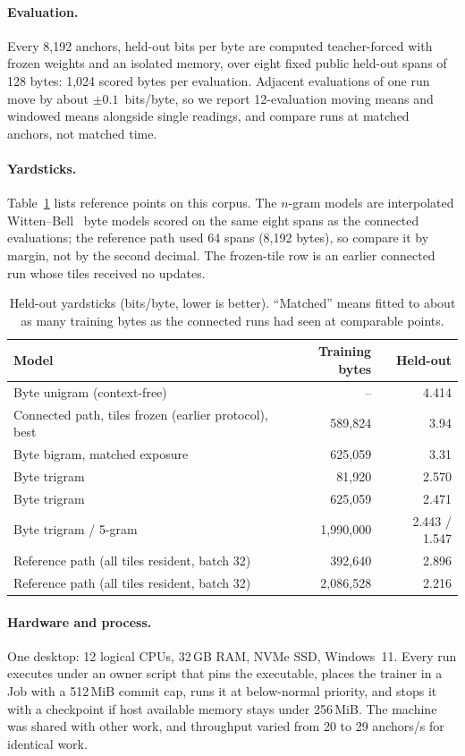 \documentclass[10pt]{article}
\newcommand{\bpb}{bits/byte}
\begin{document}
\paragraph{Evaluation.} Every 8,192 anchors, held-out bits per byte are computed teacher-forced
with frozen weights and an isolated memory, over eight fixed public held-out spans of 128 bytes:
1,024 scored bytes per evaluation. Adjacent evaluations of one run move by about $\pm0.1$~\bpb, so
we report 12-evaluation moving means and windowed means alongside single readings, and compare runs
at matched anchors, not matched time.

\paragraph{Yardsticks.} Table~\ref{tab:yardsticks} lists reference points on this corpus. The
$n$-gram models are interpolated Witten--Bell~\citep{witten1991zero} byte models scored on the same
eight spans as the connected evaluations; the reference path used 64 spans (8,192 bytes), so compare
it by margin, not by the second decimal. The frozen-tile row is an earlier connected run whose tiles
received no updates.

\begin{table}[t]
\centering
\caption{Held-out yardsticks (\bpb, lower is better). ``Matched'' means fitted to about as many
training bytes as the connected runs had seen at comparable points.}
\label{tab:yardsticks}
\begin{tabular}{lrr}
\toprule
Model & Training bytes & Held-out \\
\midrule
Byte unigram (context-free) & -- & 4.414 \\
Connected path, tiles frozen (earlier protocol), best & 589,824 & 3.94 \\
Byte bigram, matched exposure & 625,059 & 3.31 \\
Byte trigram & 81,920 & 2.570 \\
Byte trigram & 625,059 & 2.471 \\
Byte trigram / 5-gram & 1,990,000 & 2.443 / 1.547 \\
Reference path (all tiles resident, batch 32) & 392,640 & 2.896 \\
Reference path (all tiles resident, batch 32) & 2,086,528 & 2.216 \\
\bottomrule
\end{tabular}
\end{table}

\paragraph{Hardware and process.} One desktop: 12 logical CPUs, 32\,GB RAM, NVMe SSD, Windows~11.
Every run executes under an owner script that pins the executable, places the trainer in a Job with a
512\,MiB commit cap, runs it at below-normal priority, and stops it with a checkpoint if host
available memory stays under 256\,MiB. The machine was shared with other work, and throughput varied
from 20 to 29 anchors/s for identical work.
\end{document}
